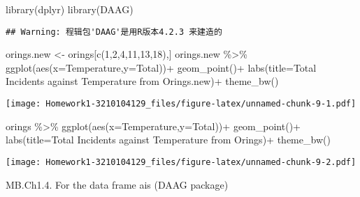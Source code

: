 \documentclass[
]{article}
\newenvironment{Shaded}{\begin{snugshade}}{\end{snugshade}}
\newcommand{\AttributeTok}[1]{\textcolor[rgb]{0.77,0.63,0.00}{#1}}
\newcommand{\DecValTok}[1]{\textcolor[rgb]{0.00,0.00,0.81}{#1}}
\newcommand{\FunctionTok}[1]{\textcolor[rgb]{0.00,0.00,0.00}{#1}}
\newcommand{\NormalTok}[1]{#1}
\newcommand{\OtherTok}[1]{\textcolor[rgb]{0.56,0.35,0.01}{#1}}
\newcommand{\SpecialCharTok}[1]{\textcolor[rgb]{0.00,0.00,0.00}{#1}}
\newcommand{\StringTok}[1]{\textcolor[rgb]{0.31,0.60,0.02}{#1}}
\begin{document}
\begin{Shaded}
\begin{Highlighting}[]
\FunctionTok{library}\NormalTok{(dplyr)}
\FunctionTok{library}\NormalTok{(DAAG)}
\end{Highlighting}
\end{Shaded}

\begin{verbatim}
## Warning: 程辑包'DAAG'是用R版本4.2.3 来建造的
\end{verbatim}

\begin{Shaded}
\begin{Highlighting}[]
\NormalTok{orings.new }\OtherTok{\textless{}{-}}\NormalTok{ orings[}\FunctionTok{c}\NormalTok{(}\DecValTok{1}\NormalTok{,}\DecValTok{2}\NormalTok{,}\DecValTok{4}\NormalTok{,}\DecValTok{11}\NormalTok{,}\DecValTok{13}\NormalTok{,}\DecValTok{18}\NormalTok{),]}
\NormalTok{orings.new }\SpecialCharTok{\%\textgreater{}\%} \FunctionTok{ggplot}\NormalTok{(}\FunctionTok{aes}\NormalTok{(}\AttributeTok{x=}\NormalTok{Temperature,}\AttributeTok{y=}\NormalTok{Total))}\SpecialCharTok{+}
  \FunctionTok{geom\_point}\NormalTok{()}\SpecialCharTok{+}
  \FunctionTok{labs}\NormalTok{(}\AttributeTok{title=}\StringTok{\textquotesingle{}Total Incidents against Temperature from Orings.new\textquotesingle{}}\NormalTok{)}\SpecialCharTok{+}
  \FunctionTok{theme\_bw}\NormalTok{()}
\end{Highlighting}
\end{Shaded}

\texttt{[image: Homework1-3210104129\_files/figure-latex/unnamed-chunk-9-1.pdf]}

\begin{Shaded}
\begin{Highlighting}[]
\NormalTok{orings }\SpecialCharTok{\%\textgreater{}\%} \FunctionTok{ggplot}\NormalTok{(}\FunctionTok{aes}\NormalTok{(}\AttributeTok{x=}\NormalTok{Temperature,}\AttributeTok{y=}\NormalTok{Total))}\SpecialCharTok{+}
  \FunctionTok{geom\_point}\NormalTok{()}\SpecialCharTok{+}
  \FunctionTok{labs}\NormalTok{(}\AttributeTok{title=}\StringTok{\textquotesingle{}Total Incidents against Temperature from Orings\textquotesingle{}}\NormalTok{)}\SpecialCharTok{+}
  \FunctionTok{theme\_bw}\NormalTok{()}
\end{Highlighting}
\end{Shaded}

\texttt{[image: Homework1-3210104129\_files/figure-latex/unnamed-chunk-9-2.pdf]}

MB.Ch1.4. For the data frame ais (DAAG package)
\end{document}
